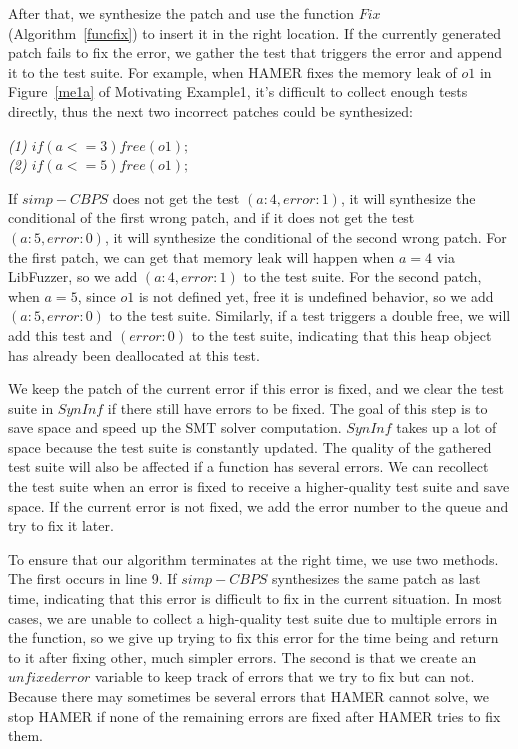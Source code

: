 \documentclass[a4paper,11pt,oneside,openany]{book}
\begin{document}
After that, we synthesize the patch and use the function $Fix$ (Algorithm~\ref{funcfix}) to insert it in the right location. If the currently generated patch fails to fix the error, we gather the test that triggers the error and append it to the test suite. For example, when HAMER fixes the memory leak of $o1$ in Figure~\ref{me1a} of Motivating Example1, it's difficult to collect enough tests directly, thus the next two incorrect patches could be synthesized:


\begin{minipage}{\textwidth}
    \vspace{0.2cm}
    \textsl{\hspace{0.3cm}(1) $if (a<=3)free(o1);$\\\hspace{0.3cm}(2) $if (a<=5)free(o1);$}
\end{minipage}
If $simp-CBPS$ does not get the test $(a:4, error:1)$, it will synthesize the conditional of the first wrong patch, and if it does not get the test $(a:5, error:0)$, it will synthesize the conditional of the second wrong patch. For the first patch, we can get that memory leak will happen when $a=4$ via LibFuzzer, so we add $(a:4, error:1)$ to the test suite. For the second patch, when $a=5$, since $o1$ is not defined yet, free it is undefined behavior, so we add $(a:5, error:0)$ to the test suite. Similarly, if a test triggers a double free, we will add this test and $(error:0)$ to the test suite, indicating that this heap object has already been deallocated at this test.


We keep the patch of the current error if this error is fixed, and we clear the test suite in $SynInf$ if there still have errors to be fixed. The goal of this step is to save space and speed up the SMT solver computation. $SynInf$ takes up a lot of space because the test suite is constantly updated. The quality of the gathered test suite will also be affected if a function has several errors. We can recollect the test suite when an error is fixed to receive a higher-quality test suite and save space. If the current error is not fixed, we add the error number to the queue and try to fix it later.



To ensure that our algorithm terminates at the right time, we use two methods. The first occurs in line 9. If $simp-CBPS$ synthesizes the same patch as last time, indicating that this error is difficult to fix in the current situation. In most cases, we are unable to collect a high-quality test suite due to multiple errors in the function, so we give up trying to fix this error for the time being and return to it after fixing other, much simpler errors. The second is that we create an $unfixederror$ variable to keep track of errors that we try to fix but can not. Because there may sometimes be several errors that HAMER cannot solve, we stop HAMER if none of the remaining errors are fixed after HAMER tries to fix them.
\end{document}
